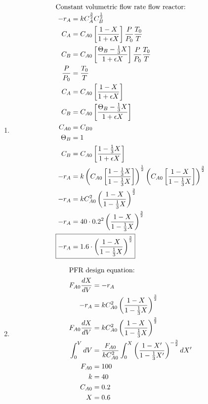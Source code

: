 \documentclass[12pt]{article}
\begin{document}
\begin{enumerate}
\begin{enumerate}
        \newpage
        \item
        \begin{align*}
            \intertext{Constant volumetric flow rate flow reactor:}
            -r_A &= k C_A^{\frac{3}{2}} C_B^{\frac{1}{2}} \\
            C_A &= C_{A0} \left[ \frac{1 - X}{1 + \epsilon X} \right] \frac{P}{P_0} \frac{T_0}{T} \\
            C_B &= C_{A0} \left[ \frac{\Theta_B - \frac{1}{3} X}{1 + \epsilon X} \right] \frac{P}{P_0} \frac{T_0}{T} \\
            \frac{P}{P_0} &= \frac{T_0}{T} \\
            C_A &= C_{A0} \left[ \frac{1 - X}{1 + \epsilon X} \right] \\
            C_B &= C_{A0} \left[ \frac{\Theta_B - \frac{1}{3} X}{1 + \epsilon X} \right] \\
            C_{A0} &= C_{B0} \\
            \Theta_B &= 1 \\
            C_B &= C_{A0} \left[ \frac{1 - \frac{1}{3} X}{1 + \epsilon X} \right] \\
            -r_A &= k \left( C_{A0} \left[ \frac{1 - \frac{1}{3} X}{1 - \frac{1}{3} X} \right] \right)^{\frac{1}{2}} \left( C_{A0} \left[ \frac{1 - X}{1 - \frac{1}{3} X} \right] \right)^{\frac{3}{2}} \\
            -r_A &= k C_{A0}^2 \left( \frac{1 - X}{1 - \frac{1}{3} X} \right)^{\frac{3}{2}} \\
            -r_A &= 40 \cdot 0.2^2 \left( \frac{1 - X}{1 - \frac{1}{3} X} \right)^{\frac{3}{2}} \\
            \Aboxed{-r_A &= 1.6 \cdot \left( \frac{1 - X}{1 - \frac{1}{3} X} \right)^{\frac{3}{2}}}
        \end{align*}


        \item
        \begin{align*}
            \intertext{PFR design equation:}
            F_{A0} \frac{dX}{dV} &= -r_A \\
            -r_A &= k C_{A0}^2 \left( \frac{1 - X}{1 - \frac{1}{3} X} \right)^{\frac{3}{2}} \\
            F_{A0} \frac{dX}{dV} &= k C_{A0}^2 \left( \frac{1 - X}{1 - \frac{1}{3} X} \right)^{\frac{3}{2}} \\
            \int_0^V dV &= \frac{F_{A0}}{k C_{A0}^2} \int_0^X \left( \frac{1 - X'}{1 - \frac{1}{3} X'} \right)^{-\frac{3}{2}} dX' \\
            F_{A0} &= 100 \\
            k &= 40 \\
            C_{A0} &= 0.2 \\
            X &= 0.6 \\
        \end{align*}


\end{enumerate}
\end{enumerate}
\end{document}
